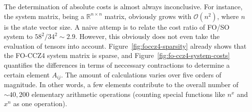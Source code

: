 The determination of
absolute costs is almost always inconclusive. For instance, the system
matrix, being a $\mathbb R^{n\times n}$ matrix, obviously grows with
$\mathcal O(n^2)$, where $n$ is the state vector size. A naive attemp is to
relate the cost ratio of FO/SO system to $58^2 / 34^2 \sim 2.9$. However,
this obviously does not even take the evaluation of tensors into account.
Figure~\ref{fig:foccz4-sparsity} already shows that the FO-CCZ4 system matrix
is sparse, and Figure~\ref{fig:fo-ccz4-system-costs} quantifies the differences
in terms of neccessary contractions to determine a certain element $A_{ij}$.
The amount of calculations varies over five orders of magnitude.
In other words, a few elements contribute to the overall number of
$\sim40,200$ elementary arithmetic operations (counting
special functions like $n^x$ and $x^n$ as one operation).

